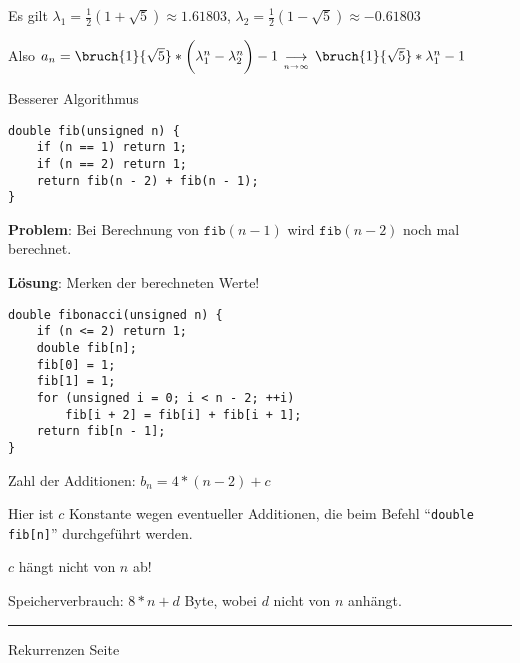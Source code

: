 
\begin{slide}{}
Es gilt $\lambda_1 = \frac{1}{2}(1 + \sqrt{5}) \approx 1.61803$,  $\lambda_2 = \frac{1}{2}(1 - \sqrt{5}) \approx -0.61803$

Also $a_n =  \bruch{1}{\sqrt{5}} * \bigg(\lambda_1^n - \lambda_2^n \bigg) - 1 \;_{\displaystyle \longrightarrow \atop {n \rightarrow \infty}}\;
             \bruch{1}{\sqrt{5}} * \lambda_1^n  - 1$
      

\normalsize
\begin{center}
Besserer Algorithmus
\end{center}
\vspace*{0.5cm}

\footnotesize
\begin{verbatim}
double fib(unsigned n) {
    if (n == 1) return 1;
    if (n == 2) return 1;
    return fib(n - 2) + fib(n - 1);
}
\end{verbatim}
\textbf{Problem}: Bei Berechnung von $\texttt{fib}(n-1)$ wird $\texttt{fib}(n-2)$ noch mal berechnet.

\textbf{L\"osung}: Merken der berechneten Werte!

\begin{verbatim}
double fibonacci(unsigned n) {
    if (n <= 2) return 1;
    double fib[n];
    fib[0] = 1;  
    fib[1] = 1;  
    for (unsigned i = 0; i < n - 2; ++i)
        fib[i + 2] = fib[i] + fib[i + 1];
    return fib[n - 1];
}
\end{verbatim}
Zahl der Additionen: $b_n = 4 * (n - 2) + c$

Hier ist $c$ Konstante wegen eventueller Additionen, die beim 
Befehl ``\texttt{double fib[n]}'' durchgef\"uhrt werden.

$c$ h\"angt nicht von $n$ ab!

Speicherverbrauch: $8 * n + d$ Byte, wobei $d$ nicht von $n$ anh\"angt.

\vspace*{\fill}
\tiny \addtocounter{mypage}{1}
\rule{17cm}{1mm}
Rekurrenzen  \hspace*{\fill} Seite 
\end{slide}


